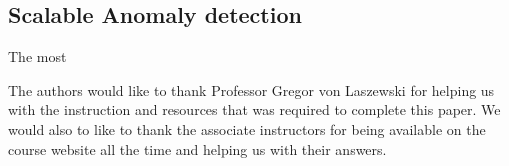 \documentclass[sigconf]{acmart}
\begin{document}
\subsection*{Scalable Anomaly detection}
The most 







\begin{acks}

  The authors would like to thank Professor Gregor von Laszewski for helping us with the instruction and resources that was required to complete this paper. We would also to like to thank the associate instructors for being available on the course website all the time and helping us with their answers.
\end{acks}


 
\end{document}
